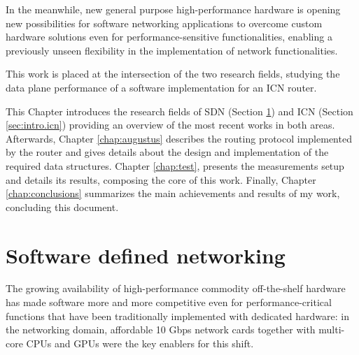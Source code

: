 \documentclass[11pt,a4paper,twoside,titlepage,openany]{book}
\begin{document}
In the meanwhile, new general purpose high-performance hardware is opening new possibilities for software networking applications to overcome custom hardware solutions even for performance-sensitive functionalities, enabling a previously unseen flexibility in the implementation of network functionalities.

This work is placed at the intersection of the two research fields, studying the data plane performance of a software implementation for an ICN router.

This Chapter introduces the research fields of \gls{SDN} (Section \ref{sec:intro.sdn}) and \gls{ICN} (Section \ref{sec:intro.icn}) providing an overview of the most recent works in both areas.
Afterwards, Chapter \ref{chap:augustus} describes the routing protocol implemented by the router and gives details about the design and implementation of the required data structures.
Chapter \ref{chap:test}, presents the measurements setup and details its results, composing the core of this work.
Finally, Chapter \ref{chap:conclusions} summarizes the main achievements and results of my work, concluding this document.

\section{Software defined networking}\label{sec:intro.sdn}
The growing availability of high-performance commodity off-the-shelf %
hardware has made software more and more competitive even for performance-critical functions that have been traditionally implemented with dedicated hardware: in the networking domain, affordable 10 Gbps network cards together with multi-core CPUs and GPUs were the key enablers for this shift.

\end{document}
